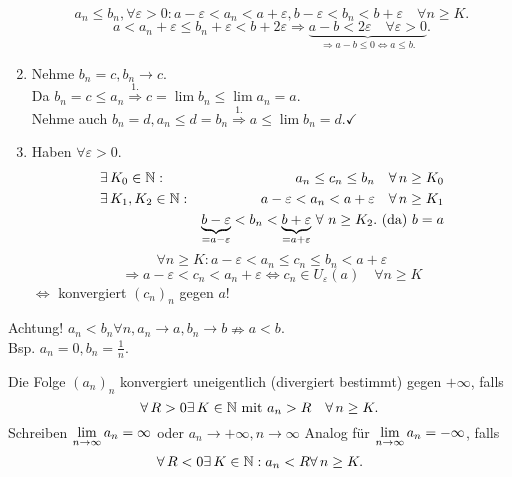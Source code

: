 \documentclass[../ana1.tex]{subfiles}
\begin{document}
\begin{bew}
\begin{enumerate}
		\[ a_n \leq b_n, \forall \varepsilon > 0: a-\varepsilon < a_n<a + \varepsilon, b-\varepsilon < b_n < b + \varepsilon \quad \forall n\geq K. \]
		\[ a < a_n + \varepsilon \leq b_n + \varepsilon < b + 2\varepsilon \Rightarrow \underbrace{a-b < 2\varepsilon \quad \forall \varepsilon > 0}_{\Rightarrow a-b\leq 0 \Leftrightarrow a\leq b.}. \]
		\item Nehme \(b_n = c, b_n \rightarrow c\).\\
		Da \(b_n = c \leq a_n \overset{1.}{\Rightarrow} c= \lim b_n \leq \lim a_n = a \).\\
		Nehme auch \(b_n = d, a_n \leq d = b_n \overset{1.}{\Rightarrow} a \leq \lim b_n = d. \checkmark \)
		\item Haben \(\forall \varepsilon > 0\).
		\begin{align*}
			&\exists K_0 \in\N: &a_n \leq c_n \leq b_n \quad \forall n\geq K_0\\
			&\exists K_1, K_2 \in\N: &a-\varepsilon < a_n < a + \varepsilon \quad \forall n\geq K_1\\
			&&\underbrace{b-\varepsilon}_{=a-\varepsilon} < b_n < \underbrace{b + \varepsilon}_{=a+\varepsilon} \, \forall \, n \geq K_2. \text{ (da) }b=a
		\end{align*}
		\[\forall  n\geq K: a-\varepsilon < a_n \leq c_n \leq b_n < a+\varepsilon \]
		\[ \Rightarrow a-\varepsilon < c_n < a_n + \varepsilon \Leftrightarrow c_n\in U_\varepsilon(a) \quad \forall n\geq K \] 
		\( \Leftrightarrow \) konvergiert \( {(c_n)}_n \) gegen \( a \)!
	\end{enumerate}
\end{bew}

Achtung! \( a_n < b_n \forall n, a_n \rightarrow a, b_n \rightarrow b \nRightarrow  a<b\).\\
Bsp. \(a_n = 0, b_n = \frac{1}{n}\).

\begin{defi}
	Die Folge \( {(a_n)}_n \) konvergiert uneigentlich (divergiert bestimmt) gegen \(+\infty \), falls 
	\[ \forall R>0 \exists K\in\N \text{ mit } a_n >R \quad \forall n\geq K. \]
	Schreiben \( \lim\limits_{n\rightarrow\infty} a_n = \infty \) oder \( a_n \rightarrow +\infty, n\rightarrow \infty \)
	Analog für \( \lim\limits_{n\rightarrow\infty} a_n = -\infty \), falls 
	\[ \forall R<0 \exists K\in\N: a_n < R \forall n\geq K. \]
\end{defi}
\end{document}

